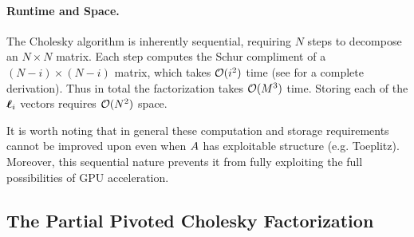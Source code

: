 \paragraph{Runtime and Space.}
The Cholesky algorithm is inherently sequential, requiring $N$ steps to decompose an $N \times N$ matrix.
Each step computes the Schur compliment of a $(N-i) \times (N-i)$ matrix, which takes $\bigo{i^2}$ time (see \citep[][Sec. 4.2]{golub2012matrix} for a complete derivation).
Thus in total the factorization takes $\bigo{M^3}$ time.
Storing each of the $\boldsymbol{\ell}_i$ vectors requires $\bigo{N^2}$ space.

It is worth noting that in general these computation and storage requirements cannot be improved upon even when $A$ has exploitable structure (e.g. Toeplitz).
Moreover, this sequential nature prevents it from fully exploiting the full possibilities of GPU acceleration.


\subsection{The Partial Pivoted Cholesky Factorization}
\label{sec:piv_chol}

